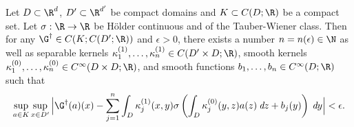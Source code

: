 \begin{theorem}
\label{thm:operator_chen}
Let \(D \subset \R^d\), \(D' \subset \R^{d'}\) be compact domains and \(K \subset C(D;\R)\) be a compact set. Let \(\sigma : \R \to \R\) be H{\"o}lder continuous and of the Tauber-Wiener class. Then for any \(\G^\dagger \in C(K; C(D';\R))\) and \(\epsilon > 0\), there exists 
a number \(n = n(\epsilon) \in \N\) as well as separable kernels \(\kappa^{(1)}_1,\dots,\kappa^{(1)}_n \in C (D' \times D;\R)\), smooth kernels \(\kappa^{(0)}_1,\dots,\kappa^{(0)}_n \in C^\infty (D \times D;\R)\), and smooth functions \(b_1,\dots,b_n \in C^\infty (D;\R)\) such that
\[\sup_{a \in K} \sup_{x \in D'} \Big| \G^\dagger(a)(x) - \sum_{j=1}^n \int_D \kappa^{(1)}_j(x, y) \sigma \left ( \int_D \kappa^{(0)}_j (y,z) a(z) \: \emph{\text{d}} z + b_j(y) \right ) \: \emph{\text{d}} y \Big| < \epsilon.\]
\end{theorem}
